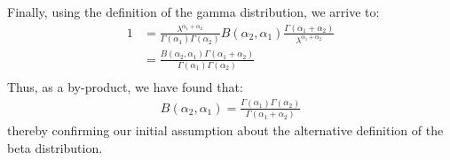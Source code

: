 \documentclass[12pt]{article}
\begin{document}
Finally, using the definition of the gamma distribution, we arrive to:
\begin{equation}
	\begin{split}
		1	&=	\frac{\lambda^{\alpha_1+\alpha_2}}{\Gamma(\alpha_1) \Gamma(\alpha_2)} B(\alpha_2,\alpha_1) \frac{\Gamma({\alpha_1+\alpha_2})}{\lambda^{\alpha_1+\alpha_2}}\\
			&=	\frac{B(\alpha_2,\alpha_1) \Gamma({\alpha_1+\alpha_2}) }{\Gamma(\alpha_1) \Gamma(\alpha_2)}\\
	\end{split}
\end{equation}
Thus, as a by-product, we have found that:
\begin{equation}\label{eq:specialcases:beta:beta}
	\begin{split}
		B(\alpha_2,\alpha_1) = \frac{\Gamma(\alpha_1) \Gamma(\alpha_2)}{\Gamma({\alpha_1+\alpha_2})}
	\end{split}
\end{equation}
thereby confirming our initial assumption about the alternative definition of the beta distribution.


\pagebreak
\end{document}

